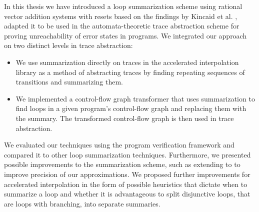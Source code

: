 In this thesis we have introduced a loop summarization scheme using rational vector addition systems with resets based on the findings by Kincaid et al. \cite{DBLP:conf/cav/SilvermanK19}, adapted it to be used in the automata-theoretic trace abstraction scheme \cite{10.1007/978-3-642-03237-0_7, 10.1007/978-3-642-39799-8_2, 10.1145/1706299.1706353} for proving unreachability of error states in programs. We integrated our \qvasr approach on two distinct levels in trace abstraction:
\begin{itemize}
	\item We use \qvasr summarization directly on traces in the accelerated interpolation library as a method of abstracting traces by finding repeating sequences of transitions and summarizing them.
	\item We implemented a control-flow graph transformer that uses \qvasr summarization to find loops in a given program's control-flow graph and replacing them with the summary. The transformed control-flow graph is then used in trace abstraction.
\end{itemize} 

We evaluated our techniques using the program verification framework \ultimate \cite{Zitat02} and compared it to other loop summarization techniques.
Furthermore, we presented possible improvements to the \qvasr summarization scheme, such as extending \qvasr to \qvasrs to improve precision of our approximations. We proposed further improvements for accelerated interpolation in the form of possible heuristics that dictate when to summarize a loop and whether it is advantageous to split disjunctive loops, that are loops with branching, into separate summaries.

